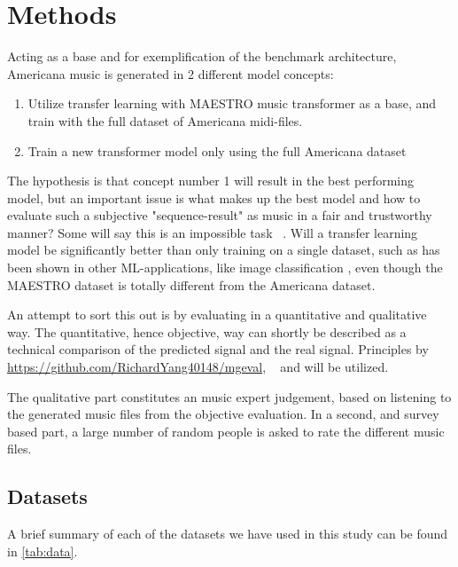 \documentclass{IEEEtran}
\begin{document}
    \section{Methods}

        Acting as a base and for exemplification of the benchmark architecture,
        Americana music is generated in 2 different model concepts:
        \begin{enumerate}
            \item Utilize transfer learning with MAESTRO music transformer as a base,
                    and train with the full dataset of Americana midi-files.
            \item Train a new transformer model only using the full Americana dataset
        \end{enumerate} 
        
        The hypothesis is that concept number 1 will result in the best performing model,
        but an important issue is what makes up the best model and how to evaluate such a
        subjective "sequence-result" as music in a fair and trustworthy manner? 
        Some will say this is an impossible task ~\cite{1030094}. Will a transfer learning model be significantly better than only training on a single dataset, such as has been shown in other ML-applications, like image classification \cite{ref}, even though the MAESTRO dataset is totally different from the Americana dataset.

        An attempt to sort this out is by evaluating in a quantitative and qualitative way.
        The quantitative, hence objective, way can shortly be described as a technical
        comparison of the predicted signal and the real signal. Principles by
        \url{https://github.com/RichardYang40148/mgeval}, ~\cite{wu2020jazz} and
         will be utilized.
        
        The qualitative part constitutes an music expert judgement,
        based on listening to the generated music files from the objective evaluation.
        In a second, and survey based part, a large number of random people is asked
        to rate the different music files.
        
    \subsection{Datasets}

        A brief summary of each of the datasets we have used in this study 
        can be found in \autoref{tab:data}.
\end{document}

